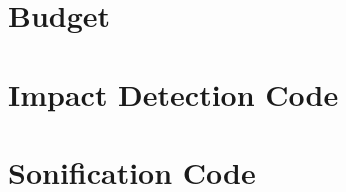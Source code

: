 \documentclass[a4paper, 11pt, twoside] {report}
\begin{document}
	\chapter{Budget}
	
	\cleardoublepage

	\printbibliography
	\cleardoublepage

	\appendix

	\chapter{Impact Detection Code}
	
	\cleardoublepage

	\chapter{Sonification Code}
	
\end{document}
